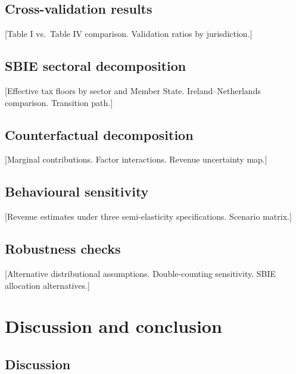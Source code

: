 \documentclass[11pt,a4paper]{article}
\begin{document}
\subsection{Cross-validation results}\label{sec:crossval_results}

[Table I vs.\ Table IV comparison. Validation ratios by jurisdiction.]

\subsection{SBIE sectoral decomposition}\label{sec:sbie_results}

[Effective tax floors by sector and Member State. Ireland--Netherlands comparison. Transition path.]

\subsection{Counterfactual decomposition}\label{sec:decomp_results}

[Marginal contributions. Factor interactions. Revenue uncertainty map.]

\subsection{Behavioural sensitivity}\label{sec:behav_results}

[Revenue estimates under three semi-elasticity specifications. Scenario matrix.]

\subsection{Robustness checks}\label{sec:robustness}

[Alternative distributional assumptions. Double-counting sensitivity. SBIE allocation alternatives.]


\newpage
\section{Discussion and conclusion}\label{sec:discussion}

\subsection{Discussion}\label{sec:discussion_main}
\end{document}
